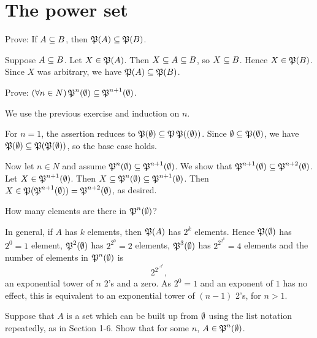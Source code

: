 \documentclass{report}
\begin{document}
\section{The power set }
\begin{exercise}
Prove: If $A\subseteq B$, then $\operatorname{\mathfrak{P}}(A)\subseteq\operatorname{\mathfrak{P}}(B)$.
\end{exercise}

\begin{solution}
Suppose $A\subseteq B$. Let $X\in\operatorname{\mathfrak{P}}(A)$. Then $X\subseteq A\subseteq B$, so $X\subseteq B$. Hence $X\in\operatorname{\mathfrak{P}}(B)$.
Since $X$ was arbitrary, we have $\operatorname{\mathfrak{P}}(A)\subseteq\operatorname{\mathfrak{P}}(B)$.
\end{solution}

\begin{exercise}
Prove: $(\forall n\in N)\operatorname{\mathfrak{P}}^{n}(\emptyset)\subseteq\operatorname{\mathfrak{P}}^{n+1}(\emptyset)$.
\end{exercise}

\begin{solution}
We use the previous exercise and induction on $n$.

For $n=1$, the assertion reduces to $\operatorname{\mathfrak{P}}(\emptyset)\subseteq\operatorname{\mathfrak{P}}\operatorname{\mathfrak{P}}((\emptyset))$.
Since $\emptyset\subseteq\operatorname{\mathfrak{P}}(\emptyset)$, we have $\operatorname{\mathfrak{P}}(\emptyset)\subseteq\operatorname{\mathfrak{P}}(\operatorname{\mathfrak{P}}(\emptyset))$, so the base case holds.

Now let $n\in N$ and assume $\operatorname{\mathfrak{P}}^{n}(\emptyset)\subseteq\operatorname{\mathfrak{P}}^{n+1}(\emptyset)$.
We show that $\operatorname{\mathfrak{P}}^{n+1}(\emptyset)\subseteq\operatorname{\mathfrak{P}}^{n+2}(\emptyset)$.
Let $X\in \operatorname{\mathfrak{P}}^{n+1}(\emptyset)$. Then $X\subseteq \operatorname{\mathfrak{P}}^{n}(\emptyset)\subseteq \operatorname{\mathfrak{P}}^{n+1}(\emptyset)$.
Then $X\in \operatorname{\mathfrak{P}}(\operatorname{\mathfrak{P}}^{n+1}(\emptyset))=\operatorname{\mathfrak{P}}^{n+2}(\emptyset)$, as desired.
\end{solution}

\begin{exercise}
How many elements are there in $\operatorname{\mathfrak{P}}^n(\emptyset)$?
\end{exercise}

\begin{solution}
In general, if $A$ has $k$ elements, then $\operatorname{\mathfrak{P}}(A)$ has $2^k$ elements.
Hence $\operatorname{\mathfrak{P}}(\emptyset)$ has $2^0=1$ element, $\operatorname{\mathfrak{P}}^2(\emptyset)$ has $2^{2^0}=2$ elements,
$\operatorname{\mathfrak{P}}^3(\emptyset)$ has $2^{2^{2^0}}=4$ elements
and the number of elements in $\operatorname{\mathfrak{P}}^n(\emptyset)$ is
\[2^{2^{\iddots^{2^0}}},\]
an exponential tower of $n$ 2's and a zero.
As $2^0=1$ and an exponent of $1$ has no effect, this is equivalent to an exponential tower of
$(n-1)$ 2's, for $n>1$.
\end{solution}

\begin{exercise}
Suppose that $A$ is a set which can be built up from $\emptyset$ using the list notation
repeatedly, as in Section 1-6. Show that for some $n$, $A \in\operatorname{\mathfrak{P}}^n(\emptyset)$.
\end{exercise}
\end{document}
